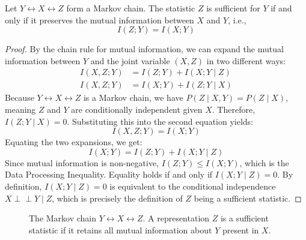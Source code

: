 \begin{theorem}
Let $Y \leftrightarrow X \leftrightarrow Z$ form a Markov chain. The statistic $Z$ is sufficient for $Y$ if and only if it preserves the mutual information between $X$ and $Y$, i.e.,
\[ I(Z; Y) = I(X; Y) \]
\end{theorem}
\begin{proof}
By the chain rule for mutual information, we can expand the mutual information between $Y$ and the joint variable $(X, Z)$ in two different ways:
\begin{align*}
I(X, Z; Y) &= I(Z; Y) + I(X; Y \mid Z) \\
I(X, Z; Y) &= I(X; Y) + I(Z; Y \mid X)
\end{align*}
Because $Y \leftrightarrow X \leftrightarrow Z$ is a Markov chain, we have $P(Z \mid X, Y) = P(Z \mid X)$, meaning $Z$ and $Y$ are conditionally independent given $X$. Therefore, $I(Z; Y \mid X) = 0$. Substituting this into the second equation yields:
\[ I(X, Z; Y) = I(X; Y) \]
Equating the two expansions, we get:
\[ I(X; Y) = I(Z; Y) + I(X; Y \mid Z) \]
Since mutual information is non-negative, $I(Z; Y) \le I(X; Y)$, which is the Data Processing Inequality. Equality holds if and only if $I(X; Y \mid Z) = 0$. By definition, $I(X; Y \mid Z) = 0$ is equivalent to the conditional independence $X \perp\!\!\!\perp Y \mid Z$, which is precisely the definition of $Z$ being a sufficient statistic.
\end{proof}

\begin{figure}[htbp]
\centering
{}
\caption{The Markov chain $Y \leftrightarrow X \leftrightarrow Z$. A representation $Z$ is a sufficient statistic if it retains all mutual information about $Y$ present in $X$.}
\label{fig:markov_sufficiency}
\end{figure}

